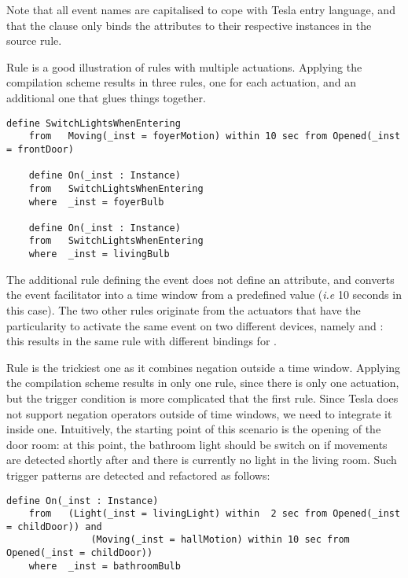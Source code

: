 Note that all event names are capitalised to cope with Tesla entry language, and that the  clause only binds the  attributes to their respective instances in the source \IOTDSL rule. 

Rule  is a good illustration of \IOTDSL rules with multiple actuations. Applying the compilation scheme results in three rules, one for each actuation, and an additional one that glues things together. 
\begin{lstlisting}[language=tesla, numbers=none]
	define SwitchLightsWhenEntering
	from   Moving(_inst = foyerMotion) within 10 sec from Opened(_inst = frontDoor)

	define On(_inst : Instance)
	from   SwitchLightsWhenEntering
	where  _inst = foyerBulb
	
	define On(_inst : Instance)
	from   SwitchLightsWhenEntering
	where  _inst = livingBulb
\end{lstlisting}

The additional rule defining the  event does not define an  attribute, and converts the event facilitator  into a time window from a predefined value (\textit{i.e} 10 seconds in this case). The two other rules originate from the actuators that have the particularity to activate the same event on two different devices, namely  and : this results in the same rule with different bindings for .

Rule  is the trickiest one as it combines negation outside a time window. Applying the compilation scheme results in only one rule, since there is only one actuation, but the trigger condition is more complicated that the first rule. Since Tesla does not support negation operators outside of time windows, we need to integrate it inside one. Intuitively, the starting point of this scenario is the opening of the door room: at this point, the bathroom light should be switch on if movements are detected shortly after and there is currently no light in the living room. Such trigger patterns are detected and refactored as follows: 
\begin{lstlisting}[language=tesla, numbers=none]
	define On(_inst : Instance)
	from   (Light(_inst = livingLight) within  2 sec from Opened(_inst = childDoor)) and 
			   (Moving(_inst = hallMotion) within 10 sec from Opened(_inst = childDoor))
	where  _inst = bathroomBulb
\end{lstlisting}
